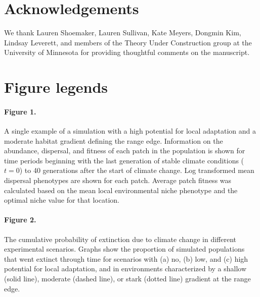 \documentclass[12pt, oneside]{article}
\begin{document}
\section*{Acknowledgements}
We thank Lauren Shoemaker, Lauren Sullivan, Kate Meyers, Dongmin Kim, Lindsay Leverett, and members of the Theory Under Construction group at the University of Minnesota for providing thoughtful comments on the manuscript. 




\newpage

\section*{Figure legends}
\paragraph{Figure 1.} A single example of a simulation with a high potential for local adaptation and a moderate habitat gradient defining the range edge. Information on the abundance, dispersal, and fitness of each patch in the population is shown for time periods beginning with the last generation of stable climate conditions ($t = 0$) to 40 generations after the start of climate change. Log transformed mean dispersal phenotypes are shown for each patch. Average patch fitness was calculated based on the mean local environmental niche phenotype and the optimal niche value for that location.

\paragraph{Figure 2.} The cumulative probability of extinction due to climate change in different experimental scenarios. Graphs show the proportion of simulated populations that went extinct through time for scenarios with (a) no, (b) low, and (c) high potential for local adaptation, and in environments characterized by a shallow (solid line), moderate (dashed line), or stark (dotted line) gradient at the range edge.
\end{document}
